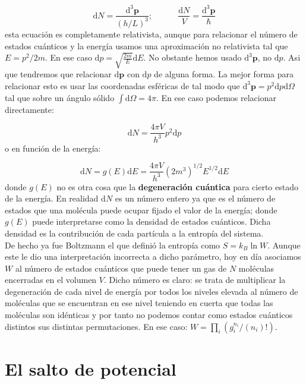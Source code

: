 \documentclass[12pt]{article}
\newcommand{\parentesis}[1]{\left( #1  \right)}
\newcommand{\D}{\mathrm{d}}
\newcommand{\tquad}{\quad \quad \quad}
\newcommand{\pn}{\mathbf{p}}
\begin{document}
\begin{equation}
\D N = \dfrac{\D^3 \pn}{(h /L)^3}; \tquad \dfrac{\D N}{V} = \dfrac{\D^3 \pn}{\hbar}
\end{equation}
esta ecuación es completamente relativista, aunque para relacionar el número de estados cuánticos y la energía usamos una aproximación no relativista tal que $E=p^2/2m$. En ese caso $\D p = \sqrt{\frac{2 m}{ E}} \D E$. No obstante hemos usado $\D^3 \pn$, no $\D p$. Asi que tendremos que relacionar $\D \pn$ con $\D p$ de alguna forma. La mejor forma para relacionar esto es usar las coordenadas esféricas de tal modo que $\D^3 \pn = p^2 \D p \D \Omega$ tal que sobre un ángulo sólido $\int \D \Omega = 4 \pi$. En ese caso podemos relacionar directamente:

\begin{equation}
\D N = \dfrac{4 \pi V}{h^3} p^2 \D p
\end{equation}
o en función de la energía:

\begin{equation}
\D N = g(E) \D E = \dfrac{4 \pi V}{h^3} \parentesis{2 m^3}^{1/2} E^{1/2} \D E
\end{equation}
donde $g(E)$ no es otra cosa que la \textbf{degeneración cuántica} para cierto estado de la energía. En realidad $\D N$ es un número entero ya que es el número de estados que una molécula puede ocupar fijado el valor de la energía; donde $g(E)$ puede interpretarse como la densidad de estados cuánticos. Dicha densidad es la contribución de cada partícula a la entropía del sistema. \\

De hecho ya fue Boltzmann el que definió la entropía como $S = k_B \ln W$. Aunque este le dio una interpretación incorrecta a dicho parámetro, hoy en día asociamos $W$ al número de estados cuánticos que puede tener un gas de $N$ moléculas encerradas en el volumen $V$. Dicho número es claro: se trata de multiplicar la degeneración de cada nivel de energía por todos los niveles elevada al número de moléculas que se encuentran en ese nivel teniendo en cuerta que todas las moléculas son idénticas y por tanto no podemos contar como estados cuánticos distintos sus distintas permutaciones. En ese caso: $W = \prod_i (g_i^{n_i} /(n_i)!)$.  



\section{El salto de potencial}
\end{document}
